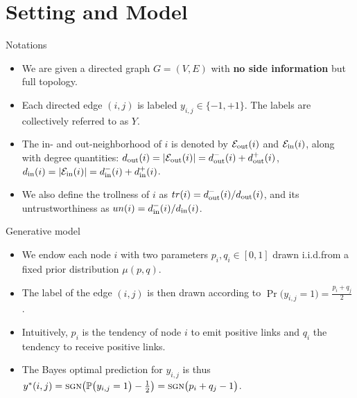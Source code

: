 \documentclass[svgnames,ignorenonframetext,final]{beamer}
\begin{document}


\section{Setting and Model}\label{setting-and-model}

\begin{frame}{Notations}

\begin{itemize}
\item
  We are given a directed graph \(G=(V, E)\) with \textbf{no side information} but full topology.
\item
  Each directed edge \((i,j)\) is labeled
  \(y_{i,j} \in \{-1, +1\}\). The labels are collectively
  referred to as \(Y\).
\item
  The in- and out-neighborhood of $i$ is denoted by $\mathcal{E}_{\mathrm{out}}(i)$ and $\mathcal{E}_{\mathrm{in}}(i)$, along with degree
  quantities:
  $d_{\mathrm{out}}(i)=|\mathcal{E}_{\mathrm{out}}(i)|=d_{\mathrm{out}}^-(i)+d_{\mathrm{out}}^+(i)$,\\
  $d_{\mathrm{in}}(i)=|\mathcal{E}_{\mathrm{in}}(i)|=d_{\mathrm{in}}^-(i)+d_{\mathrm{in}}^+(i)$.
\item We also define the \alert{trollness} of $i$ as \(tr(i) = d_{\mathrm{out}}^-(i)/d_{\mathrm{out}}(i)\), and its
  \alert{untrustworthiness} as \(un(i) = d_{\mathrm{in}}^-(i)/d_{\mathrm{in}}(i)\).
\end{itemize}

\end{frame}

\begin{frame}{Generative model}

\begin{itemize}
\item
  We endow each node \(i\) with two parameters \(p_i, q_i \in [0,1]\)
  drawn i.i.d.\@ from a fixed prior distribution \(\mu(p,q)\).
\item
  The label of the edge $(i,j)$ is then drawn according to
  \(\Pr\big( y_{i,j} = 1 \big) = \frac{p_i + q_j}{2}\).
\item
  Intuitively, \(p_i\) is the tendency of node \(i\) to emit positive
  links and \(q_i\) the tendency to receive positive links.
\item
  The Bayes optimal prediction for \(y_{i,j}\) is thus
  \(y^*(i,j) = \mbox{\sc sgn}\big(\mathbb{P}\big( y_{i,j} = 1 \big) - \frac{1}{2}\big) = \mbox{\sc sgn}\big(p_i + q_j - 1\big)\).
\end{itemize}

\end{frame}
\end{document}
